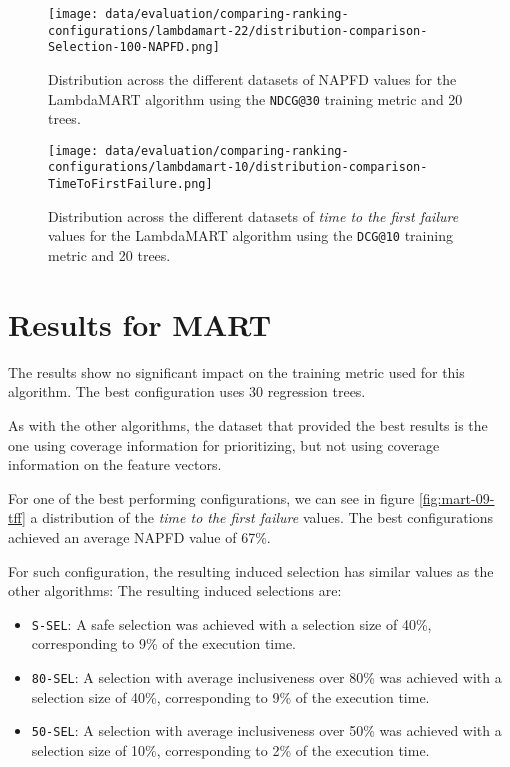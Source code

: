 \begin{figure}
    \centering
    \begin{minipage}{.45\textwidth}
        \centering
        \texttt{[image: data/evaluation/comparing-ranking-configurations/lambdamart-22/distribution-comparison-Selection-100-NAPFD.png]}
        \parbox{0.9\textwidth}{
            \caption{Distribution across the different datasets of NAPFD values for the LambdaMART algorithm using the \texttt{NDCG@30} training metric and 20 trees.}
        \label{fig:lambdamart-22-napfd}
            }
    \end{minipage}%
    \begin{minipage}{.45\textwidth}
        \centering
        \texttt{[image: data/evaluation/comparing-ranking-configurations/lambdamart-10/distribution-comparison-TimeToFirstFailure.png]}
        \parbox{0.9\textwidth}{
            \caption{Distribution across the different datasets of \emph{time to the first failure} values for the LambdaMART algorithm using the \texttt{DCG@10} training metric and 20 trees.}
        \label{fig:lambdamart-10-tff}
            }
    \end{minipage}%
\end{figure}

\section{Results for MART}
The results show no significant impact on the training metric used for this algorithm. The best configuration uses 30 regression trees.

As with the other algorithms, the dataset that provided the best results is the one using coverage information for prioritizing, but
not using coverage information on the feature vectors.

For one of the best performing configurations, we can see in figure \ref{fig:mart-09-tff} a distribution of
the \emph{time to the first failure} values. The best configurations achieved an average NAPFD value of 67\%.

For such configuration, the resulting induced selection has similar values as the other algorithms:
The resulting induced selections are:
\begin{itemize}
    \item \texttt{S-SEL}: A safe selection was achieved with a selection size of 40\%, corresponding to 9\% of the execution time.
    \item \texttt{80-SEL}: A selection with average inclusiveness over 80\% was achieved with a selection size of 40\%, corresponding to 9\% of the execution time.
    \item \texttt{50-SEL}: A selection with average inclusiveness over 50\% was achieved with a selection size of 10\%, corresponding to 2\% of the execution time.
\end{itemize}

